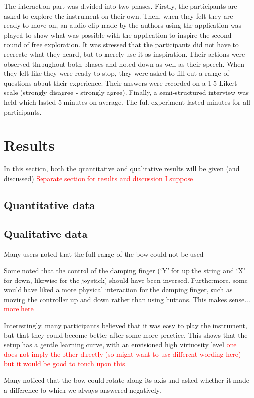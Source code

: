 \documentclass[dvipsnames, pdftex]{article}
\def\SWcomment[#1]{\textcolor{Red}{#1}}
\begin{document}
The interaction part was divided into two phases. Firstly, the participants are asked to explore the instrument on their own. Then, when they felt they are ready to move on, an audio clip made by the authors using the application was played to show what was possible with the application to inspire the second round of free exploration. It was stressed that the participants did not have to recreate what they heard, but to merely use it as inspiration. Their actions were observed throughout both phases and noted down as well as their speech. When they felt like they were ready to stop, they were asked to fill out a range of questions about their experience. Their answers were recorded on a 1-5 Likert scale (strongly disagree - strongly agree). Finally, a semi-structured interview was held which lasted 5 minutes on average. The full experiment lasted  minutes for all participants.

\section{Results}
In this section, both the quantitative and qualitative results will be given (and discussed) \SWcomment[Separate section for results and discussion I suppose]
\subsection{Quantitative data}
\subsection{Qualitative data}
Many users noted that the full range of the bow could not be used

Some noted that the control of the damping finger (`Y' for up the string and `X' for down, likewise for the joystick) should have been inversed. Furthermore, some would have liked a more physical interaction for the damping finger, such as moving the controller up and down rather than using buttons. This makes sense... \SWcomment[more here]

Interestingly, many participants believed that it was easy to play the instrument, but that they could become better after some more practice. This shows that the setup has a gentle learning curve, with an envisioned high virtuosity level \SWcomment[one does not imply the other directly (so might want to use different wording here) but it would be good to touch upon this]

Many noticed that the bow could rotate along its axis and asked whether it made a difference to which we always answered negatively. 
\end{document}
